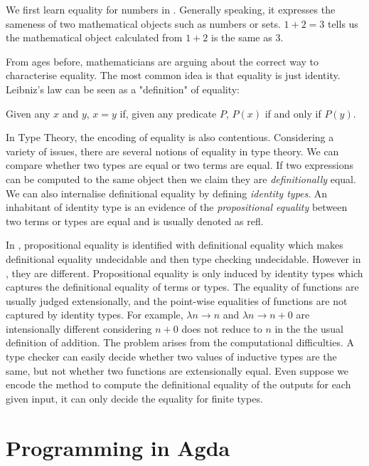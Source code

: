 We first learn equality for numbers in \maths. Generally speaking, it
expresses the sameness of two mathematical objects such as numbers or sets.
$1+2=3$ tells us the mathematical object calculated from $1+2$ is the
same as $3$.

From ages before, mathematicians are arguing about the correct way to
characterise equality. The most common idea is that equality is just
identity. Leibniz's law can be seen as a "definition" of
equality:

Given any $x$ and $y$, $x = y$ if, given any predicate $P$, $P(x)$ if and only
if $P(y)$.




In Type Theory, the encoding of equality is also contentious. Considering a variety of issues, there are
several notions of equality in type theory.
We can compare whether two types are equal or two terms are equal. If two
expressions can be computed to the same object then we claim they are
 \emph{definitionally} equal.  
 We can also internalise definitional equality by defining \emph{identity types}. An inhabitant of identity type is an evidence of the \emph{propositional equality} between two terms or types are equal and is usually denoted as refl. 

In \ett, propositional equality is identified with definitional equality which makes definitional equality undecidable and then type checking undecidable. However in \itt, they are different. Propositional equality is only induced by identity types which captures the definitional equality of terms or types. The equality of functions are usually judged extensionally, and the point-wise equalities of functions are not captured by identity types. For example, $\lambda n \to n$ and $\lambda n \to n + 0$ are intensionally different considering $n+0$ does not reduce to $n$ in the the usual definition of addition.
The problem arises from the computational difficulties. A type checker can easily decide whether two
values of inductive types are the same, but not whether two functions
are extensionally equal. Even suppose we encode the method to compute
the definitional equality of the outputs for each given input, it can
only decide the equality for finite types.

\section{Programming in Agda}

